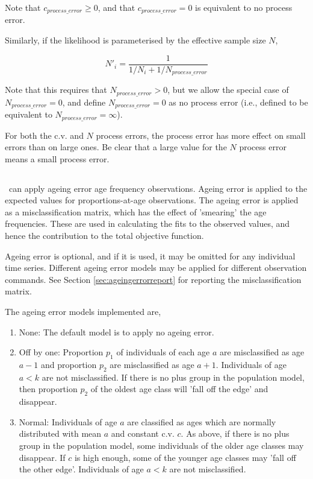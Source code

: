 {{{{Note that $c_{process\_ error} \ge 0$, and that $c_{process\_ error} = 0$ is equivalent to no process error.

Similarly, if the likelihood is parameterised by the effective sample size $N$,

\begin{equation}
 N'_i  = \frac{1}{1 / {N_i}+ 1 / N_{process\_error}}
\end{equation}

Note that this requires that $N_{process\_ error} > 0$, but we allow the special case of $N_{process\_ error}=0$, and define $N_{process\_ error}=0$ as no process error (i.e., defined to be equivalent to $N_{process\_ error}=\infty$). 

For both the c.v. and $N$ process errors, the process error has more effect on small errors than on large ones. Be clear that a large value for the $N$ process error means a small process error.

\subsection{}

\CNAME\ can apply ageing error age frequency observations. Ageing error is applied to the expected values for proportions-at-age observations. The ageing error is applied as a misclassification matrix, which has the effect of 'smearing' the age frequencies. These are used in calculating the fits to the observed values, and hence the contribution to the total objective function. 

Ageing error is optional, and if it is used, it may be omitted for any individual time series. Different ageing error models may be applied for different observation commands. See Section \ref{sec:ageingerrorreport} for reporting the misclassification matrix.

The ageing error models implemented are,
\begin{enumerate}
  \item{None}: The default model is to apply no ageing error.
  \item{Off by one}: Proportion $p_1$ of individuals of each age $a$ are misclassified as age $a-1$ and proportion $p_2$ are misclassified as age $a+1$. Individuals of age $a < k$ are not misclassified. If there is no plus group in the population model, then proportion $p_2$ of the oldest age class will 'fall off the edge' and disappear. 
  \item{Normal}: Individuals of age $a$ are classified as ages which are normally distributed with mean $a$ and constant c.v. $c$. As above, if there is no plus group in the population model, some individuals of the older age classes may disappear. If $c$ is high enough, some of the younger age classes may 'fall off the other edge'. Individuals of age $a < k$ are not misclassified.
\end{enumerate}

}}}}
